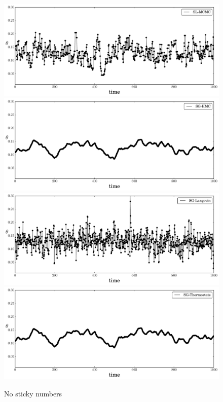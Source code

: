 \documentclass[]{article}
\begin{document}
\begin{figure}[t]
\setlength{\linewidth}{\textwidth}
\setlength{\hsize}{\textwidth}
\begin{center}
\includegraphics[width=0.95\columnwidth]{./images/exp-SL-MCMC-theta-timeseries-omega-rate-100p0-chain0.pdf}
\includegraphics[width=0.95\columnwidth]{./images/exp-SG-HMC-theta-timeseries-omega-rate-100p0-chain0.pdf}
\includegraphics[width=0.95\columnwidth]{./images/exp-SG-Langevin-theta-timeseries-omega-rate-100p0-chain0.pdf}
\includegraphics[width=0.95\columnwidth]{./images/exp-SG-Thermostats-theta-timeseries-omega-rate-100p0-chain0.pdf}
\caption{\small{No sticky numbers}}
\label{fig:exp-theta-traces}
\end{center}
\vskip -0.2in
\end{figure} 
\end{document}
